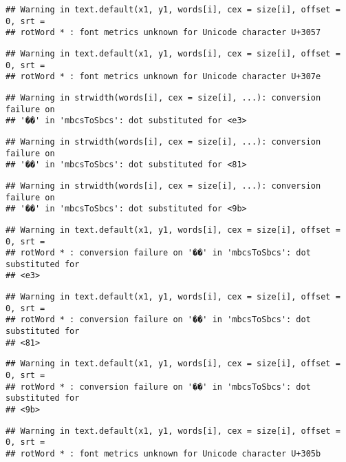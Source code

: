 \documentclass[]{article}
\begin{document}
\begin{verbatim}
## Warning in text.default(x1, y1, words[i], cex = size[i], offset = 0, srt =
## rotWord * : font metrics unknown for Unicode character U+3057
\end{verbatim}

\begin{verbatim}
## Warning in text.default(x1, y1, words[i], cex = size[i], offset = 0, srt =
## rotWord * : font metrics unknown for Unicode character U+307e
\end{verbatim}

\begin{verbatim}
## Warning in strwidth(words[i], cex = size[i], ...): conversion failure on
## '��' in 'mbcsToSbcs': dot substituted for <e3>
\end{verbatim}

\begin{verbatim}
## Warning in strwidth(words[i], cex = size[i], ...): conversion failure on
## '��' in 'mbcsToSbcs': dot substituted for <81>
\end{verbatim}

\begin{verbatim}
## Warning in strwidth(words[i], cex = size[i], ...): conversion failure on
## '��' in 'mbcsToSbcs': dot substituted for <9b>
\end{verbatim}

\begin{verbatim}
## Warning in text.default(x1, y1, words[i], cex = size[i], offset = 0, srt =
## rotWord * : conversion failure on '��' in 'mbcsToSbcs': dot substituted for
## <e3>
\end{verbatim}

\begin{verbatim}
## Warning in text.default(x1, y1, words[i], cex = size[i], offset = 0, srt =
## rotWord * : conversion failure on '��' in 'mbcsToSbcs': dot substituted for
## <81>
\end{verbatim}

\begin{verbatim}
## Warning in text.default(x1, y1, words[i], cex = size[i], offset = 0, srt =
## rotWord * : conversion failure on '��' in 'mbcsToSbcs': dot substituted for
## <9b>
\end{verbatim}

\begin{verbatim}
## Warning in text.default(x1, y1, words[i], cex = size[i], offset = 0, srt =
## rotWord * : font metrics unknown for Unicode character U+305b
\end{verbatim}
\end{document}
